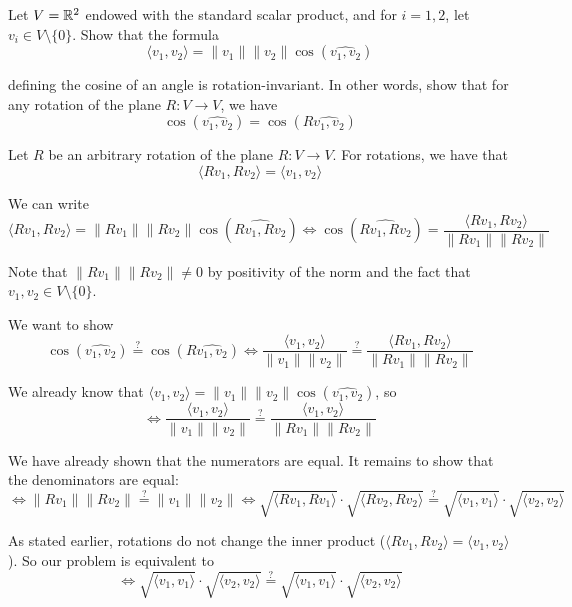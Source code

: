 \documentclass[12pt]{article}
\begin{document}
\begin{problem}{}{}
    Let $V = \mathbb{R}^2$ endowed with the standard scalar product, and for $i = 1, 2$, let $v_i \in V \setminus \{0\}$. Show that the formula
    $$
        \langle v_1, v_2 \rangle = \lVert v_1 \rVert \lVert v_2 \rVert \cos(\widehat{v_1, v_2})
    $$
    
    defining the cosine of an angle is rotation-invariant. In other words, show that for any rotation of the plane $R: V \rightarrow V$, we have
    $$
        \cos(\widehat{v_1, v_2}) = \cos(R \widehat{v_1, v_2})
    $$
\end{problem}

Let $R$ be an arbitrary rotation of the plane $R: V \rightarrow V$. For rotations, we have that 
$$
    \langle R v_1, R v_2 \rangle = \langle v_1, v_2 \rangle
$$

We can write
$$
    \langle R v_1, R v_2 \rangle = \lVert R v_1 \rVert \lVert R v_2 \rVert \cos(\widehat{R v_1, R v_2}) \iff \cos(\widehat{R v_1, R v_2}) = \frac{\langle R v_1, R v_2 \rangle}{\lVert R v_1 \rVert \lVert R v_2 \rVert}
$$

Note that $\lVert R v_1 \rVert \lVert R v_2 \rVert \neq 0$ by positivity of the norm and the fact that $v_1, v_2 \in V \setminus \{0\}$.

We want to show
$$
    \cos(\widehat{v_1, v_2}) \overset{?}= \cos(R \widehat{v_1, v_2}) \iff \frac{\langle v_1, v_2 \rangle}{\lVert v_1 \rVert \lVert v_2 \rVert} \overset{?}= \frac{\langle R v_1, R v_2 \rangle}{\lVert R v_1 \rVert \lVert R v_2 \rVert}
$$

We already know that $\langle v_1, v_2 \rangle = \lVert v_1 \rVert \lVert v_2 \rVert \cos(\widehat{v_1, v_2})$, so
$$
    \iff \frac{\langle v_1, v_2 \rangle}{\lVert v_1 \rVert \lVert v_2 \rVert} \overset{?}= \frac{\langle v_1, v_2 \rangle}{\lVert R v_1 \rVert \lVert R v_2 \rVert}
$$

We have already shown that the numerators are equal. It remains to show that the denominators are equal:
$$
    \iff \lVert R v_1 \rVert \lVert R v_2 \rVert \overset{?}= \lVert v_1 \rVert \lVert v_2 \rVert \iff \sqrt{\langle R v_1, R v_1 \rangle} \cdot \sqrt{\langle R v_2, R v_2 \rangle} \overset{?}= \sqrt{\langle v_1, v_1 \rangle} \cdot \sqrt{\langle v_2, v_2 \rangle}
$$

As stated earlier, rotations do not change the inner product ($\langle R v_1, R v_2 \rangle = \langle v_1, v_2 \rangle$). So our problem is equivalent to
$$
    \iff \sqrt{\langle v_1, v_1 \rangle} \cdot \sqrt{\langle v_2, v_2 \rangle} \overset{?}= \sqrt{\langle v_1, v_1 \rangle} \cdot \sqrt{\langle v_2, v_2 \rangle}
$$
\end{document}

